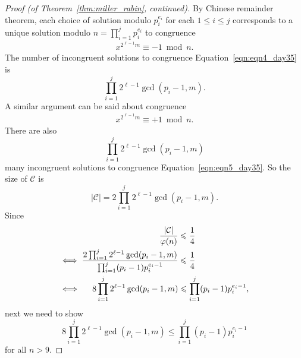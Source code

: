 \documentclass{amsbook}
\theoremstyle{plain}
\theoremstyle{definition}
\theoremstyle{remark}
\numberwithin{equation}{chapter}
\numberwithin{figure}{chapter}
\newcommand{\sC}{\mathcal{C}}
\begin{document}
\begin{proof}[Proof {\rm (of Theorem~\ref{thm:miller_rabin}, continued)}]
By Chinese remainder theorem, each choice of solution modulo $p_i^{e_i}$ for each $1 \leqslant i \leqslant j$ corresponds to a unique solution modulo $n = \prod_{i = 1}^j p_i^{e_i}$ to congruence
\begin{align}
  x^{2^{\ell - 1}m} \equiv -1 \bmod n. \label{eqn:eqn4_day35}
\end{align}
The number of incongruent solutions to congruence Equation~\eqref{eqn:eqn4_day35} is 
\[
\prod_{i = 1}^j 2^{\ell - 1} \gcd (p_i - 1, m).
\]
A similar argument can be said about congruence 
\begin{align}
  x^{2^{\ell - 1}m} \equiv +1 \bmod n. \label{eqn:eqn5_day35}
\end{align}
There are also
\[
\prod_{i = 1}^j 2^{\ell - 1} \gcd (p_i - 1, m)
\]
many incongruent solutions to congruence Equation~\eqref{eqn:eqn5_day35}. So the size of $\sC$ is 
\[
\vert \sC \vert  = 2 \prod_{i = 1}^j 2^{\ell - 1} \gcd (p_i - 1, m).
\]
Since 
\begin{align}
  \frac{\vert \sC \vert}{\varphi (n)} &\leqslant \frac{1}4 \\
\iff \frac{ 2 \prod_{i = 1}^j 2^{\ell - 1} \gcd (p_i - 1, m) }{ \prod_{i = 1}^j (p_i - 1) p_i^{e_i -1} } &\leqslant \frac{1}4 \\
\iff \hspace{4.3mm} 8 \prod_{i = 1}^j 2^{\ell - 1} \gcd (p_i - 1, m) &\leqslant \prod_{i = 1}^j (p_i - 1) p_i^{e_i -1},
\end{align}
next we need to show 
\[
8 \prod_{i = 1}^j 2^{\ell - 1} \gcd (p_i - 1, m) \leqslant \prod_{i = 1}^j (p_i - 1) p_i^{e_i -1}
\]
for all $n > 9$.

\end{proof}
\end{document}
